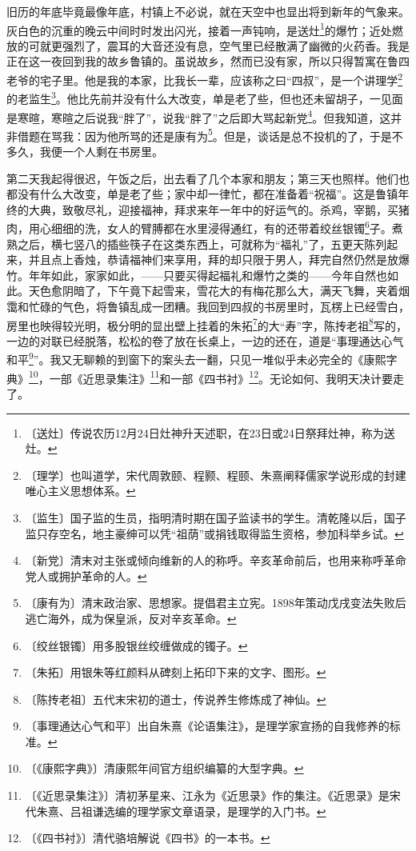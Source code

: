 \documentclass[12pt,UTF-8,openany]{ctexbook}
\begin{document}
\begin{large}
    
    旧历的年底毕竟最像年底，村镇上不必说，就在天空中也显出将到新年的气象来。灰白色的沉重的晚云中间时时发出闪光，接着一声钝响，是送灶\footnote{〔送灶〕传说农历12月24日灶神升天述职，在23日或24日祭拜灶神，称为送灶。}的爆竹；近处燃放的可就更强烈了，震耳的大音还没有息，空气里已经散满了幽微的火药香。我是正在这一夜回到我的故乡鲁镇的。虽说故乡，然而已没有家，所以只得暂寓在鲁四老爷的宅子里。他是我的本家，比我长一辈，应该称之曰“四叔”，是一个讲理学\footnote{〔理学〕也叫道学，宋代周敦颐、程颢、程颐、朱熹阐释儒家学说形成的封建唯心主义思想体系。}的老监生\footnote{〔监生〕国子监的生员，指明清时期在国子监读书的学生。清乾隆以后，国子监只存空名，地主豪绅可以凭“祖荫”或捐钱取得监生资格，参加科举乡试。}。他比先前并没有什么大改变，单是老了些，但也还未留胡子，一见面是寒暄，寒暄之后说我“胖了”，说我“胖了”之后即大骂起新党\footnote{〔新党〕清末对主张或倾向维新的人的称呼。辛亥革命前后，也用来称呼革命党人或拥护革命的人。}。但我知道，这并非借题在骂我：因为他所骂的还是康有为\footnote{〔康有为〕清末政治家、思想家。提倡君主立宪。1898年策动戊戌变法失败后逃亡海外，成为保皇派，反对辛亥革命。}。但是，谈话是总不投机的了，于是不多久，我便一个人剩在书房里。
    
    第二天我起得很迟，午饭之后，出去看了几个本家和朋友；第三天也照样。他们也都没有什么大改变，单是老了些；家中却一律忙，都在准备着“祝福”。这是鲁镇年终的大典，致敬尽礼，迎接福神，拜求来年一年中的好运气的。杀鸡，宰鹅，买猪肉，用心细细的洗，女人的臂膊都在水里浸得通红，有的还带着绞丝银镯\footnote{〔绞丝银镯〕用多股银丝绞缠做成的镯子。}子。煮熟之后，横七竖八的插些筷子在这类东西上，可就称为“福礼”了，五更天陈列起来，并且点上香烛，恭请福神们来享用，拜的却只限于男人，拜完自然仍然是放爆竹。年年如此，家家如此，——只要买得起福礼和爆竹之类的——今年自然也如此。天色愈阴暗了，下午竟下起雪来，雪花大的有梅花那么大，满天飞舞，夹着烟霭和忙碌的气色，将鲁镇乱成一团糟。我回到四叔的书房里时，瓦楞上已经雪白，房里也映得较光明，极分明的显出壁上挂着的朱拓\footnote{〔朱拓〕用银朱等红颜料从碑刻上拓印下来的文字、图形。}的大“寿”字，陈抟老祖\footnote{〔陈抟老祖〕五代末宋初的道士，传说养生修炼成了神仙。}写的，一边的对联已经脱落，松松的卷了放在长桌上，一边的还在，道是“事理通达心气和平\footnote{〔事理通达心气和平〕出自朱熹《论语集注》，是理学家宣扬的自我修养的标准。}”。我又无聊赖的到窗下的案头去一翻，只见一堆似乎未必完全的《康熙字典》\footnote{〔《康熙字典》〕清康熙年间官方组织编纂的大型字典。}，一部《近思录集注》\footnote{〔《近思录集注》〕清初茅星来、江永为《近思录》作的集注。《近思录》是宋代朱熹、吕祖谦选编的理学家文章语录，是理学的入门书。}和一部《四书衬》\footnote{〔《四书衬》〕清代骆培解说《四书》的一本书。}。无论如何、我明天决计要走了。
    

\end{large}
\end{document}
